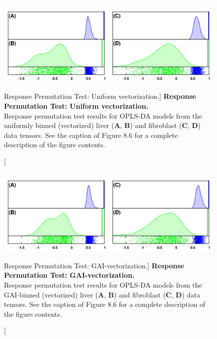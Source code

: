 \begin{figure}[ht!]
\includegraphics[width=6in]{figs/gaibin/08-perm-unif-vec.png}
\caption
      [Response Permutation Test: Uniform vectorization.]{
  {\bf Response Permutation Test: Uniform vectorization.}
  \\
  Response permutation test results for OPLS-DA models from the uniformly
  binned (vectorized) liver ({\bf A}, {\bf B}) and fibroblast
  ({\bf C}, {\bf D}) data tensors. See the caption of Figure 8.6 for a
  complete description of the figure contents.
}
\label{figure.8.8}
\end{figure}

\begin{figure}[ht!]
\includegraphics[width=6in]{figs/gaibin/09-perm-gai-vec.png}
\caption
      [Response Permutation Test: GAI-vectorization.]{
  {\bf Response Permutation Test: GAI-vectorization.}
  \\
  Response permutation test results for OPLS-DA models from the GAI-binned
  (vectorized) liver ({\bf A}, {\bf B}) and fibroblast
  ({\bf C}, {\bf D}) data tensors. See the caption of Figure 8.6 for a
  complete description of the figure contents.
}
\label{figure.8.9}
\end{figure}

\newpage



